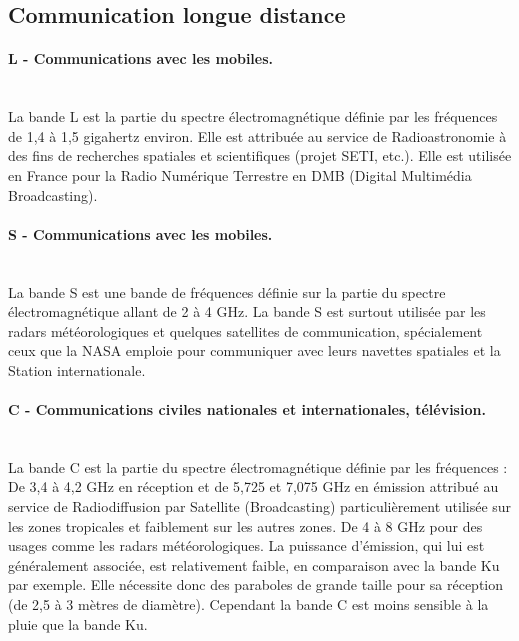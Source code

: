     \subsection{Communication longue distance}

            \paragraph{L - Communications avec les mobiles.}~\\
                La bande L est la partie du spectre électromagnétique définie par les fréquences de 1,4 à 1,5 gigahertz environ. Elle est attribuée au service de Radioastronomie à des fins de recherches spatiales et scientifiques (projet SETI, etc.). Elle est utilisée en France pour la Radio Numérique Terrestre en DMB (Digital Multimédia Broadcasting).

            \paragraph{S - Communications avec les mobiles.}~\\
                La bande S est une bande de fréquences définie sur la partie du spectre électromagnétique allant de 2 à 4 GHz.
                La bande S est surtout utilisée par les radars météorologiques et quelques satellites de communication, spécialement ceux que la NASA emploie pour communiquer avec leurs navettes spatiales et la Station internationale.

            \paragraph{C - Communications civiles nationales et internationales, télévision.}~\\
                La bande C est la partie du spectre électromagnétique définie par les fréquences :
                    De 3,4 à 4,2 GHz en réception et de 5,725 et 7,075 GHz en émission attribué au service de Radiodiffusion par Satellite (Broadcasting) particulièrement utilisée sur les zones tropicales et faiblement sur les autres zones.
                    De 4 à 8 GHz pour des usages comme les radars météorologiques.
                La puissance d'émission, qui lui est généralement associée, est relativement faible, en comparaison avec la bande Ku par exemple. Elle nécessite donc des paraboles de grande taille pour sa réception (de 2,5 à 3 mètres de diamètre). Cependant la bande C est moins sensible à la pluie que la bande Ku.

